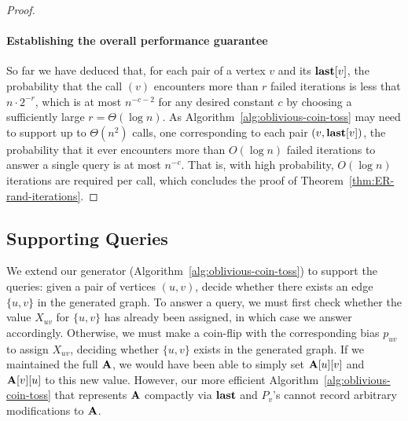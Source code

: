 \begin{proof}
\paragraph*{Establishing the overall performance guarantee}
So far we have deduced that, for each pair of a vertex $v$ and its $\mathbf{last}[v]$, the probability that the call $(v)$ encounters more than $r$ failed iterations is less that $n \cdot 2^{-r}$, which is at most $n^{-c-2}$ for any desired constant $c$ by choosing a sufficiently large $r = \Theta(\log n)$. As Algorithm~\ref{alg:oblivious-coin-toss} may need to support up to $\Theta(n^2)$  calls, one corresponding to each pair $(v, \mathbf{last}[v])$, the probability that it ever encounters more than $O(\log n)$  failed iterations to answer a single  query is at most $n^{-c}$. That is, with high probability, $O(\log n)$ iterations are required per  call, which concludes the proof of Theorem~\ref{thm:ER-rand-iterations}.
\end{proof}

\subsection{Supporting  Queries} \label{sec:ER-pair}

We extend our generator (Algorithm~\ref{alg:oblivious-coin-toss}) to support the  queries: given a pair of vertices $(u, v)$, decide whether there exists an edge $\{u, v\}$ in the generated graph. To answer a  query, we must first check whether the value $X_{uv}$ for $\{u, v\}$ has already been assigned, in which case we answer accordingly. Otherwise, we must make a coin-flip with the corresponding bias $p_{uv}$ to assign $X_{uv}$, deciding whether $\{u, v\}$ exists in the generated graph. If we maintained the full $\mathbf{A}$, we would have been able to simply set $\mathbf{A}[u][v]$ and $\mathbf{A}[v][u]$ to this new value. However, our more efficient Algorithm~\ref{alg:oblivious-coin-toss} that represents $\mathbf{A}$ compactly via $\mathbf{last}$ and $P_v$'s cannot record arbitrary modifications to $\mathbf{A}$.

